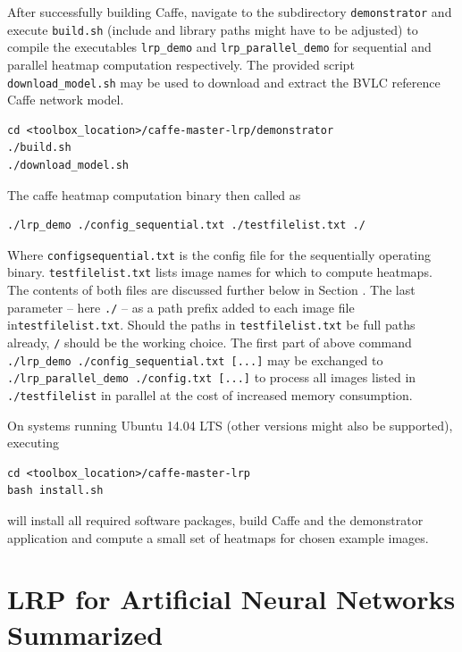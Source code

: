 \documentclass[a4wide]{article}
\begin{document}
After successfully building Caffe, navigate to the subdirectory \texttt{demonstrator} and execute \texttt{build.sh} (include and library paths might have to be adjusted) to compile the executables \texttt{lrp\_demo} and \texttt{lrp\_parallel\_demo} for sequential and parallel heatmap computation respectively. The provided script \texttt{download\_model.sh} may be used to download and extract the  BVLC reference Caffe network model.
\begin{Verbatim}[frame = single]
cd <toolbox_location>/caffe-master-lrp/demonstrator
./build.sh
./download_model.sh
\end{Verbatim}
The caffe heatmap computation binary then called as
\begin{Verbatim}[frame = single]
./lrp_demo ./config_sequential.txt ./testfilelist.txt ./
\end{Verbatim}
Where \texttt{config\textunderscore sequential.txt} is the config file for the sequentially operating binary. \texttt{testfilelist.txt} lists image names for which to compute heatmaps. The contents of both files are discussed further below in Section . The last parameter -- here \texttt{./} -- as a path prefix added to each image file in\texttt{testfilelist.txt}. Should the paths in \texttt{testfilelist.txt} be full paths already, \texttt{/} should be the working choice.
The first part of above command \texttt{./lrp\_demo ./config\_sequential.txt [...]} may be exchanged to \texttt{./lrp\_parallel\_demo ./config.txt [...]} to process all images listed in \texttt{./testfilelist} in parallel at the cost of increased memory consumption.

On systems running Ubuntu 14.04 LTS (other versions might also be supported), executing
\begin{Verbatim}[frame = single]
cd <toolbox_location>/caffe-master-lrp
bash install.sh
\end{Verbatim}
will install all required software packages, build Caffe and the demonstrator application and compute a small set of heatmaps for chosen example images.

\section{LRP for Artificial Neural Networks Summarized}
\label{sec:lrp}
\end{document}
